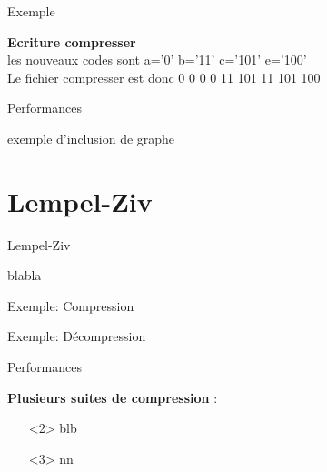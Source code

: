 \documentclass[french]{beamer}
\begin{document}
\begin{frame}{Exemple}
\begin{center}

\textbf{Ecriture compresser}\\
les nouveaux codes sont a='0' b='11' c='101' e='100'\\
Le fichier compresser est donc 0 0 0 0 11 101 11 101 100
\end{center}
\end{frame}
\begin{frame}{Performances}
	\begin{center}
	exemple d'inclusion de graphe 
	\end{center}
\end{frame}

\section{Lempel-Ziv}
\begin{frame}{Lempel-Ziv}
	\begin{center}
	blabla
	\end{center}
\end{frame}


\begin{frame}{Exemple: Compression}
	\begin{center}
	\end{center}
\end{frame}
\begin{frame}{Exemple: Décompression}
	\begin{center}
	\end{center}
\end{frame}

\begin{frame}{Performances}
	\begin{center}
	\textbf{Plusieurs suites de compression} :
	\begin{itemize}
	\item[]<2>  	blb%
	\item[]<3>  	nn%
	\end{itemize}
	\end{center}
\end{frame}
\end{document}
